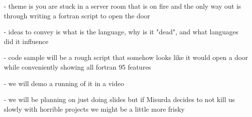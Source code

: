 - theme is you are stuck in a server room that is on fire and the only way out is through writing a fortran script to open the door

- ideas to convey is what is the language, why is it "dead", and what languages did it influence

- code sample will be a rough script that somehow looks like it would open a door while conveniently showing all fortran 95 features

- we will demo a running of it in a video

- we will be planning on just doing slides but if Misurda decides to not kill us slowly with horrible projects we might be a little
  more frisky
